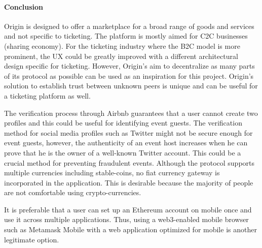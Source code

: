 \paragraph{Conclusion}
Origin is designed to offer a marketplace for a broad range of goods and services and not specific to ticketing. The platform is mostly aimed for C2C businesses (sharing economy). For the ticketing industry where the B2C model is more prominent, the UX could be greatly improved with a different architectural design specific for ticketing.
However, Origin's aim to decentralize as many parts of its protocol as possible can be used as an inspiration for this project. Origin's solution to establish trust between unknown peers is unique and can be useful for a ticketing platform as well. 

The verification process through Airbnb guarantees that a user cannot create two profiles and this could be useful for identifying event guests. The verification method for social media profiles such as Twitter might not be secure enough for event guests, however, the authenticity of an event host increases when he can prove that he is the owner of a well-known Twitter account. 
This could be a crucial method for preventing fraudulent events.
Although the protocol supports multiple currencies including stable-coins, no fiat currency gateway is incorporated in the application. This is desirable because the majority of people are not comfortable using crypto-currencies.

It is preferable that a user can set up an Ethereum account on mobile once and use it across multiple applications. Thus, using a web3-enabled mobile browser such as Metamask Mobile with a web application optimized for mobile is another legitimate option.


